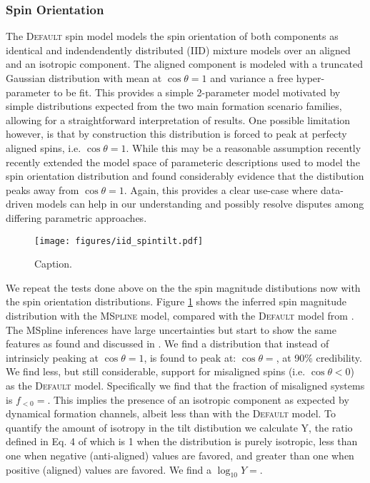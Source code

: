 \subsubsection{Spin Orientation}

The \textsc{Default} spin model models the spin orientation of both components as identical and indendendently distributed (IID) mixture models over an
aligned and an isotropic component. The aligned component is modeled with a truncated Gaussian distribution with mean at $\cos{\theta}=1$ and variance a free 
hyper-parameter to be fit. This provides a simple 2-parameter model motivated by simple distributions expected from the two main formation scenario families, allowing 
for a straightforward interpretation of results. One possible limitation however, is that by construction this distribution is forced to peak at perfecty aligned spins, 
i.e. $\cos{\theta}=1$. While this may be a reasonable assumption recently \citet{spinitasyoulike} recently extended the model space of parameteric descriptions 
used to model the spin orientation distribution and found considerably evidence that the distibution peaks away from $\cos{\theta}=1$. Again, this provides a clear 
use-case where data-driven models can help in our understanding and possibly resolve disputes among differing parametric approaches.

\begin{figure}
    \texttt{[image: figures/iid\_spintilt.pdf]}
    \caption{Caption.}
    \label{fig:iid_spintilt_dist}
\end{figure}

We repeat the tests done above on the the spin magnitude distibutions now with the spin orientation distributions. Figure \ref{fig:iid_spintilt_dist} 
shows the inferred spin magnitude distribution with the \textsc{MSpline} model, compared with the \textsc{Default} model from \citet{o3b_astro_dist}. 
The MSpline inferences have large uncertainties but start to show the same features as found and discussed in \citet{spinitasyoulike}. 
We find a distribution that instead of intrinsicly peaking at $\cos{\theta}=1$, is found to peak at: $\cos{\theta}=$\result{$\CIPlusMinus{\macros[MSplineIIDCompSpins][peakCosTilt]}$}, at 
90\% credibility. We find less, but still considerable, support for misaligned spins (i.e. $\cos{\theta}<0$) as the \textsc{Default} model. Specifically we 
find that the fraction of misaligned systems is $f_{<0}=$\result{$\CIPlusMinus{\macros[MSplineIIDCompSpins][negFrac]}$}. This implies 
the presence of an isotropic component as expected by dynamical formation channels, albeit less than with the \textsc{Default} model. To quantify the 
amount of isotropy in the tilt distibution we calculate Y, the ratio defined in Eq. 4 of \citet{spinitasyoulike} which is 1 when the distribution is 
purely isotropic, less than one when negative (anti-aligned) values are favored, and greater than one when positive (aligned) values are favored.
We find a $\log_{10}Y=$. 

